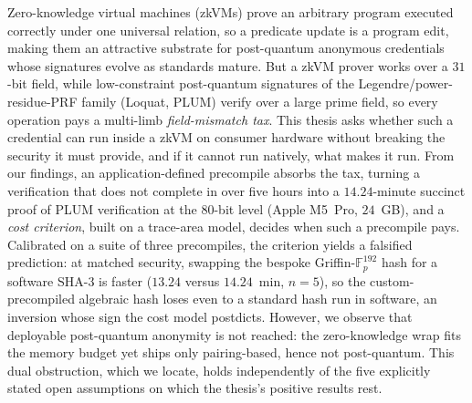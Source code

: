 \documentclass[dvipdfmx, a4j, 12pt]{article}
\date{July 20th, 2026}
\title{}
\author{Takumi Otsuka}
\theoremstyle{definition}
\theoremstyle{remark}
\begin{document}
    \maketitle
    
    \begin{coverabstract}
       Zero-knowledge virtual machines (zkVMs) prove an arbitrary program executed correctly under one universal relation, so a predicate update is a program edit, making them an attractive substrate for post-quantum anonymous credentials whose signatures evolve as standards mature. But a zkVM prover works over a $31$-bit field, while low-constraint post-quantum signatures of the Legendre/power-residue-PRF family (Loquat, PLUM) verify over a large prime field, so every operation pays a multi-limb \emph{field-mismatch tax}. This thesis asks whether such a credential can run inside a zkVM on consumer hardware without breaking the security it must provide, and if it cannot run natively, what makes it run. From our findings, an application-defined precompile absorbs the tax, turning a verification that does not complete in over five hours into a $14.24$-minute succinct proof of PLUM verification at the $80$-bit level (Apple M5~Pro, $24$~GB), and a \emph{cost criterion}, built on a trace-area model, decides when such a precompile pays. Calibrated on a suite of three precompiles, the criterion yields a falsified prediction: at matched security, swapping the bespoke Griffin-$\mathbb{F}_p^{192}$ hash for a software SHA-3 is faster ($13.24$ versus $14.24$~min, $n{=}5$), so the custom-precompiled algebraic hash loses even to a standard hash run in software, an inversion whose sign the cost model postdicts. However, we observe that deployable post-quantum anonymity is not reached: the zero-knowledge wrap fits the memory budget yet ships only pairing-based, hence not post-quantum. This dual obstruction, which we locate, holds independently of the five explicitly stated open assumptions on which the thesis's positive results rest.
    \end{coverabstract}
    \newpage
    
    \tableofcontents
    \newpage
    
    \listoffigures
    \newpage
    
    \listoftables
    \newpage
    
    
    \newpage
    
    \newpage
    
    \newpage
    
    \newpage
    
    \newpage
     
    \newpage
    
    \newpage
    
    \newpage
    
    \newpage
    \acknowledgement

    \newpage
    
    
    

    \newpage
    
    
\end{document}
